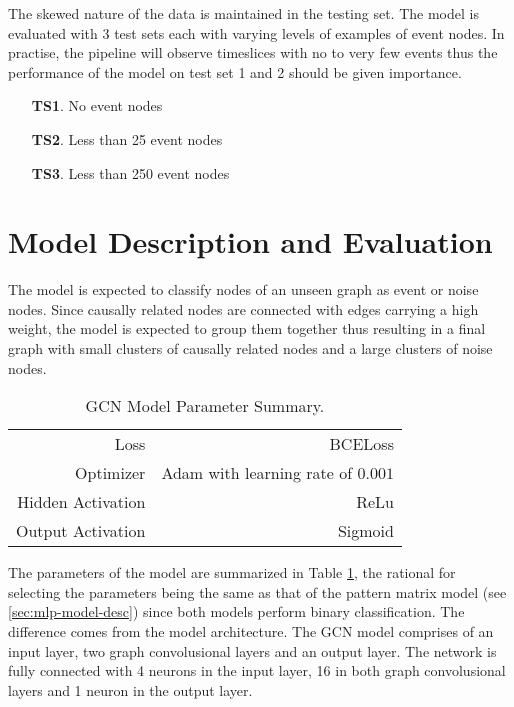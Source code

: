 The skewed nature of the data is maintained in the testing set. The
model is evaluated with 3 test sets each with varying levels of
examples of event nodes. In practise, the pipeline will observe
timeslices with no to very few events thus the performance of the
model on test set 1 and 2 should be given importance.

\begin{enumerate}
\item[\textbf{TS1}.] No event nodes
\item[\textbf{TS2}.] Less than 25 event nodes
\item[\textbf{TS3}.] Less than 250 event nodes
\end{enumerate}

\section{Model Description and Evaluation}
\label{sec:gcn-model-desc-eval}

The model is expected to classify nodes of an unseen graph as event or
noise nodes. Since causally related nodes are connected with edges
carrying a high weight, the model is expected to group them together
thus resulting in a final graph with small clusters of causally
related nodes and a large clusters of noise nodes.

\begin{table}[t]
  \centering
  \begin{tabular}{rr}
    \hline
    Loss & BCELoss \\
    Optimizer & Adam with learning rate of $0.001$ \\
    Hidden Activation & ReLu \\
    Output Activation & Sigmoid \\
    \hline
  \end{tabular}
  \caption{GCN Model Parameter Summary.}
  \label{tab:gcn-model-param}
\end{table}

The parameters of the model are summarized in Table
\ref{tab:gcn-model-param}, the rational for selecting the parameters
being the same as that of the pattern matrix model (see
\ref{sec:mlp-model-desc}) since both models perform binary
classification. The difference comes from the model architecture. The
GCN model comprises of an input layer, two graph convolusional layers
and an output layer. The network is fully connected with 4 neurons in
the input layer, 16 in both graph convolusional layers and 1 neuron in
the output layer.

